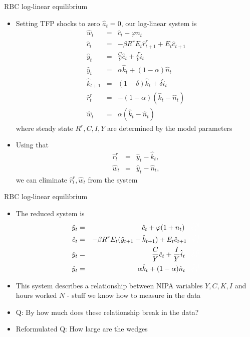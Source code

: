 \documentclass[9pt,xcolor={dvipsnames}]{beamer}
\newcommand{\bit}{\begin{itemize}}
\newcommand{\eit}{\end{itemize}}
\newcommand{\wc}{\color{white}}
\begin{document}
\begin{frame}{RBC log-linear equilibrium}

\bit
\setlength\itemsep{1.5em} 

\item Setting TFP shocks to zero $\hat a_t=0$, our log-linear system is
\begin{eqnarray}
\hat w_t &=& \hat c_t + \varphi n_t \nonumber \\
\hat c_t &=& - \beta R^{r} E_t \hat r^{r}_{t+1} + E_t \hat {c}_{t+1} \nonumber \\
\hat y_t &=& \frac{C}{Y}\hat c_t + \frac{I}{Y} \hat i_t  \nonumber \\
\hat y_t &=& \alpha \hat k_t + (1-\alpha ) \hat n_t \nonumber \\
\hat k_{t+1} &=& (1-\delta) \hat k_t +\delta \hat i_t \nonumber\\
\hat r^{r}_t &=& -(1-\alpha)(\hat k_t - \hat n_t)  \nonumber \\
\hat w_t &=& \alpha (\hat k_t-\hat n_t) \nonumber
\end{eqnarray}
where steady state $R^{r}, C, I, Y$ are determined by the model parameters

\item Using that 
\begin{eqnarray}
\hat r^{r}_t &=& \hat y_t-\hat k_t, \nonumber \\
\hat w_t &=& \hat y_t-\hat n_t, \nonumber
\end{eqnarray}
we can eliminate $\hat r^{r}_t, \hat w_t$ from the system

\eit

\end{frame}


\begin{frame}{RBC log-linear equilibrium}

\bit
\setlength\itemsep{1.5em} 

\item The reduced system is
\begin{eqnarray}
\hat y_t &=& \hat c_t + \varphi (1+n_t) {\wc + \hat \psi^N_t} \nonumber \\
\hat c_t &=& - \beta R^{r}  E_t (\hat y_{t+1}-\hat k_{t+1}) + E_t \hat {c}_{t+1} {\wc + \hat \psi^I_t} \nonumber \\
\hat y_t &=& \frac{C}{Y}\hat c_t + \frac{I}{Y} \hat i_t {\wc + \hat \psi^G_t} \nonumber \\
\hat y_t &=& \alpha \hat k_t + (1-\alpha ) \hat n_t {\wc + \hat \psi^A_t} \nonumber 
\end{eqnarray}

\item This system describes a relationship between NIPA variables $Y,C,K,I$ and hours worked $N$ - stuff we know how to measure in the data

\item Q: By how much does these relationship break in the data?

\item {\wc Reformulated Q: How large are the {\wc wedges}}
\eit

\end{frame}
\end{document}
